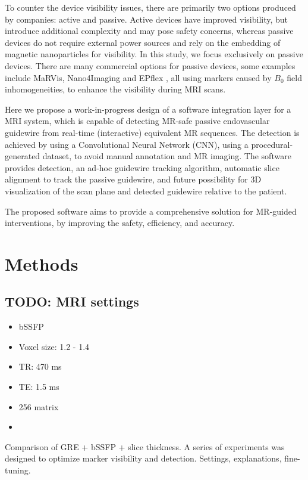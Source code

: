 \documentclass[conference]{IEEEtran}
\begin{document}
To counter the device visibility issues, there are primarily two options produced by companies: active and passive. Active devices have improved visibility, but introduce additional complexity and may pose safety concerns, whereas passive devices do not require external power sources and rely on the embedding of magnetic nanoparticles for visibility. In this study, we focus exclusively on passive devices. There are many commercial options for passive devices, some examples include MaRVis\cite{marvistech-guidewires}, Nano4Imaging\cite{nano4imaging-guidewires} and EPflex \cite{epflex-guidewires}, all using markers caused by \(B_0\) field inhomogeneities, to enhance the visibility during MRI scans.

Here we propose a work-in-progress design of a software integration layer for a MRI system, which is capable of detecting MR-safe passive endovascular guidewire from real-time (interactive) equivalent MR sequences. The detection is achieved by using a Convolutional Neural Network (CNN), using a procedural-generated dataset, to avoid manual annotation and MR imaging. The software provides detection, an ad-hoc guidewire tracking algorithm, automatic slice alignment to track the passive guidewire, and future possibility for 3D visualization of the scan plane and detected guidewire relative to the patient.

The proposed software aims to provide a comprehensive solution for MR-guided interventions, by improving the safety, efficiency, and accuracy.

\section{Methods}

\subsection{TODO: MRI settings}\label{MRI-settings}

\begin{itemize}
    \item bSSFP
    \item Voxel size: 1.2 - 1.4
    \item TR: 470 ms
    \item TE: 1.5 ms
    \item 256 matrix
    \item 
\end{itemize}
Comparison of GRE + bSSFP + slice thickness.
A series of experiments was designed to optimize marker visibility and detection.
Settings, explanations, fine-tuning.
\end{document}
